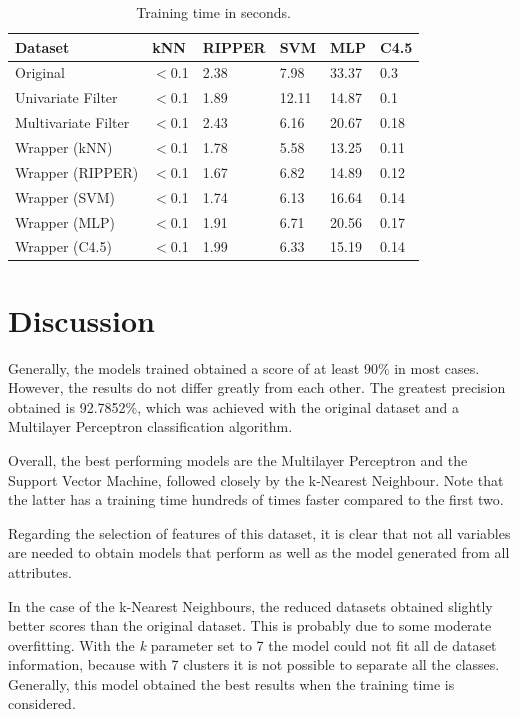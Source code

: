 \documentclass[a4paper,11pt]{article}
\begin{document}
\begin{table}[h]
\centering
\begin{tabular}{||l|l|l|l|l|l||}
	\hline
	Dataset & kNN & RIPPER & SVM & MLP & C4.5\\
	\hline
	Original & $<$0.1 & 2.38 & 7.98 & 33.37 & 0.3\\
	Univariate Filter & $<$0.1 & 1.89 & 12.11 & 14.87 & 0.1\\
	Multivariate Filter & $<$0.1 & 2.43 & 6.16 & 20.67 & 0.18\\
	Wrapper (kNN) & $<$0.1 & 1.78 & 5.58 & 13.25 & 0.11\\
	Wrapper (RIPPER) & $<$0.1 & 1.67 & 6.82 & 14.89 & 0.12\\
	Wrapper (SVM) & $<$0.1 & 1.74 & 6.13 & 16.64 & 0.14\\
	Wrapper (MLP) & $<$0.1 & 1.91 & 6.71 & 20.56 & 0.17\\
	Wrapper (C4.5) & $<$0.1 & 1.99 & 6.33 & 15.19 & 0.14\\
    \hline 
\end{tabular}
\caption{Training time in seconds.}
\label{tab:table7}
\end{table}

\section{Discussion}
\label{sec:discussion}

Generally, the models trained obtained a score of at least 90\% in most cases. However, the results do not differ greatly from each other. The greatest precision obtained is 92.7852\%, which was achieved with the original dataset and a Multilayer Perceptron classification algorithm.

Overall, the best performing models are the Multilayer Perceptron and the Support Vector Machine, followed closely by the k-Nearest Neighbour. Note that the latter has a training time hundreds of times faster compared to the first two.

Regarding the selection of features of this dataset, it is clear that not all variables are needed to obtain models that perform as well as the model generated from all attributes.

In the case of the k-Nearest Neighbours, the reduced datasets obtained slightly better scores than the original dataset. This is probably due to some moderate overfitting. With the \textit{k} parameter set to 7 the model could not fit all de dataset information, because with 7 clusters it is not possible to separate all the classes. Generally, this model obtained the best results when the training time is considered.
\end{document}

